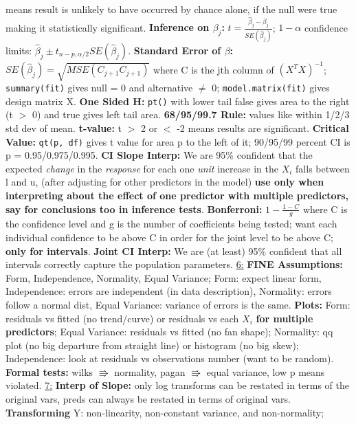 \documentclass[8pt]{extarticle}
\begin{document}
means result is unlikely to have occurred by chance alone, if the null were true 
making it statistically significant.
\textbf{Inference on $\beta_j$:} $t = \frac{\hat{\beta}_j - \beta_j}{SE(\hat{\beta}_j)}$;
$ 1 - \alpha$ confidence limits: $\hat{\beta}_j \pm t_{n-p, \alpha/2}SE(\hat{\beta}_j)$.
\textbf{Standard Error of $\beta$:} $SE(\hat{\beta}_j) = \sqrt{MSE(C_{j+1}C_{j+1})}$ 
where C is the jth column of $(X^TX)^{-1}$; \texttt{summary(fit)} gives null = 0
and alternative $\neq$ 0; \texttt{model.matrix(fit)} gives design matrix X.
\textbf{One Sided H:} \texttt{pt()} with lower tail false gives area to the right
(t $>$ 0) and true gives left tail area.
\textbf{68/95/99.7 Rule:} values like within 1/2/3 std dev of mean.
\textbf{t-value:} t $>$ 2 or $<$ -2 means results are significant.
\textbf{Critical Value:} \texttt{qt(p, df)} gives t value for area p to the left of it;
90/95/99 percent CI is p = 0.95/0.975/0.995.
\textbf{CI Slope Interp:} We are 95\% confident that the expected \textit{change} 
in the \textit{response} for each one \textit{unit} increase in the \textit{$X_i$}
falls between l and u, (after adjusting for other predictors in the model) 
\textbf{use only when interpreting about the effect of one predictor with multiple
predictors, say for conclusions too in inference tests}.
\textbf{Bonferroni:} $1 - \frac{1-C}{g}$ where C is the confidence level and g is
the number of coefficients being tested; want each individual confidence to be 
above C in order for the joint level to be above C; \textbf{only for intervals}.
\textbf{Joint CI Interp:} We are (at least) 95\% confident that all intervals 
correctly capture the population parameters.
\underline{6:}
\textbf{FINE Assumptions:} Form, Independence, Normality, Equal Variance;
Form: expect linear form, Independence: errors are independent (in data 
description), Normality: errors follow a normal dist, Equal Variance: variance 
of errors is the same.
\textbf{Plots:} Form: residuals vs fitted (no trend/curve) or residuals vs each 
$X_i$ \textbf{for multiple predictors}; Equal Variance: residuals vs fitted 
(no fan shape); Normality: qq plot (no big departure from straight line) or 
histogram (no big skew); Independence: look at residuals vs observations 
number (want to be random).
\textbf{Formal tests:} wilks $\Rrightarrow$ normality, pagan $\Rrightarrow$ equal 
variance, low p means violated.
\underline{7:}
\textbf{Interp of Slope:} only log transforms can be restated in terms of the 
original vars, preds can always be restated in terms of original vars.
\textbf{Transforming} Y: non-linearity, non-constant variance, and non-normality; 
\end{document}
